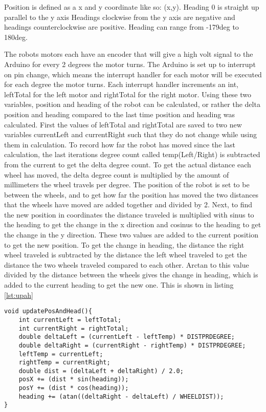 Position is defined as a x and y coordinate like so: (x,y). \newline
Heading 0 is straight up parallel to the y axis \newline
Headings clockwise from the y axis are negative and headings counterclockwise are positive. \newline
Heading can range from -179deg to 180deg. \newline

The robots motors each have an encoder that will give a high volt signal to the Arduino for every 2 degrees the motor turns. The Arduino is set up to interrupt on pin change, which means the interrupt handler for each motor will be executed for each degree the motor turns. Each interrupt handler increments an int, leftTotal for the left motor and rightTotal for the right motor. \newline
Using these two variables, position and heading of the robot can be calculated, or rather the delta position and heading compared to the last time position and heading was calculated.
First the values of leftTotal and rightTotal are saved to two new variables currentLeft and currentRight such that they do not change while using them in calculation. To record how far the robot has moved since the last calculation, the last iterations degree count called temp(Left/Right) is subtracted from the current to get the delta degree count. To get the actual distance each wheel has moved, the delta degree count is multiplied by the amount of millimeters the wheel travels per degree. The position of the robot is set to be between the wheels, and to get how far the position has moved the two distances that the wheels have moved are added together and divided by 2. Next, to find the new position in coordinates the distance traveled is multiplied with sinus to the heading to get the change in the x direction and cosinus to the heading to get the change in the y direction. These two values are added to the current position to get the new position. To get the change in heading, the distance the right wheel traveled is subtracted by the distance the left wheel traveled to get the distance the two wheels traveled compared to each other. Arctan to this value divided by the distance between the wheels gives the change in heading, which is added to the current heading to get the new one. This is shown in listing \ref{lst:upah}

\begin{lstlisting}[caption={updatePosAndHead function}, label={lst:upah}]
void updatePosAndHead(){
	int currentLeft = leftTotal;
	int currentRight = rightTotal;
	double deltaLeft = (currentLeft - leftTemp) * DISTPRDEGREE;
	double deltaRight = (currentRight - rightTemp) * DISTPRDEGREE;
	leftTemp = currentLeft;
	rightTemp = currentRight;
	double dist = (deltaLeft + deltaRight) / 2.0;
	posX += (dist * sin(heading));
	posY += (dist * cos(heading));
	heading += (atan((deltaRight - deltaLeft) / WHEELDIST));
}
\end{lstlisting}

